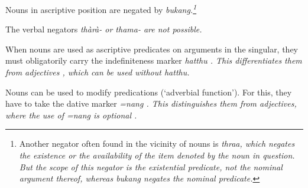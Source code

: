 Nouns in ascriptive position are negated by \em bukang\em.\footnote{Another negator often found in the vicinity of nouns is \em thraa\em, which negates the existence or the availability of the item denoted by the noun in question. But the scope of this negator is the existential predicate, not the nominal argument thereof, whereas \em bukang \em negates the nominal predicate.}




The verbal negators \em thàrà- \em or \em thama- \em are not possible.


When nouns are used as ascriptive predicates on arguments in the singular, they must obligatorily carry the indefiniteness marker \em hatthu \em {}. This differentiates them from adjectives , which can be used without \em hatthu\em.



Nouns can be used to modify predications (`adverbial function').  For this, they have to take the dative marker \em =nang \em {}. This distinguishes them from adjectives, where the use of \em =nang \em is optional .



